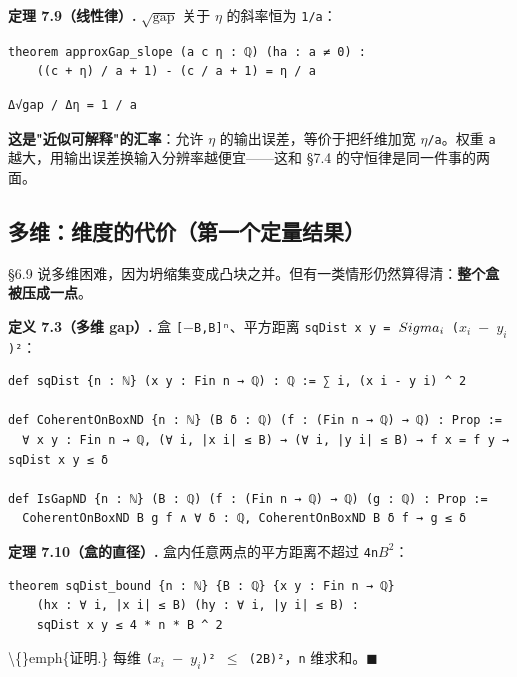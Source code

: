 \documentclass[11pt,a4paper]{ctexart}
\begin{document}
\textbf{定理 7.9（线性律）.} \texttt{\ensuremath{\sqrt{\mathrm{gap}}}} 关于 \texttt{\ensuremath{\eta}} 的斜率恒为 \texttt{1/a}：

\begin{lstlisting}
theorem approxGap_slope (a c η : ℚ) (ha : a ≠ 0) :
    ((c + η) / a + 1) - (c / a + 1) = η / a
\end{lstlisting}

\begin{lstlisting}
Δ√gap / Δη = 1 / a
\end{lstlisting}

\textbf{这是"近似可解释"的汇率}：允许 \texttt{\ensuremath{\eta}} 的输出误差，等价于把纤维加宽 \texttt{\ensuremath{\eta}/a}。权重 \texttt{a} 越大，用输出误差换输入分辨率越便宜——这和 §7.4 的守恒律是同一件事的两面。

\subsection{多维：维度的代价（第一个定量结果）}

§6.9 说多维困难，因为坍缩集变成凸块之并。但有一类情形仍然算得清：\textbf{整个盒被压成一点}。

\textbf{定义 7.3（多维 gap）.} 盒 \texttt{[\ensuremath{-}B,B]ⁿ}、平方距离 \texttt{sqDist x y = \ensuremath{\\Sigma_{i}} (\ensuremath{x_{i}} \ensuremath{-} \ensuremath{y_{i}})²}：

\begin{lstlisting}
def sqDist {n : ℕ} (x y : Fin n → ℚ) : ℚ := ∑ i, (x i - y i) ^ 2

def CoherentOnBoxND {n : ℕ} (B δ : ℚ) (f : (Fin n → ℚ) → ℚ) : Prop :=
  ∀ x y : Fin n → ℚ, (∀ i, |x i| ≤ B) → (∀ i, |y i| ≤ B) → f x = f y → sqDist x y ≤ δ

def IsGapND {n : ℕ} (B : ℚ) (f : (Fin n → ℚ) → ℚ) (g : ℚ) : Prop :=
  CoherentOnBoxND B g f ∧ ∀ δ : ℚ, CoherentOnBoxND B δ f → g ≤ δ
\end{lstlisting}

\textbf{定理 7.10（盒的直径）.} 盒内任意两点的平方距离不超过 \texttt{4n\ensuremath{B^{2}}}：

\begin{lstlisting}
theorem sqDist_bound {n : ℕ} {B : ℚ} {x y : Fin n → ℚ}
    (hx : ∀ i, |x i| ≤ B) (hy : ∀ i, |y i| ≤ B) :
    sqDist x y ≤ 4 * n * B ^ 2
\end{lstlisting}

\textbackslash\{\}emph\{证明.\} 每维 \texttt{(\ensuremath{x_{i}} \ensuremath{-} \ensuremath{y_{i}})² \ensuremath{\le} (2B)²}，\texttt{n} 维求和。\ensuremath{\ensuremath{\blacksquare}}
\end{document}
